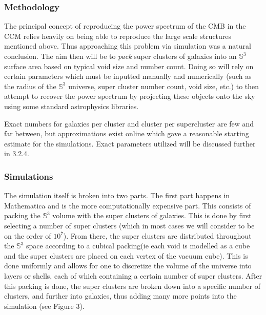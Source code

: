 \documentclass[a4paper]{article}
\begin{document}
    \subsubsection{Methodology}
    The principal concept of reproducing the power spectrum of the CMB in the
    CCM relies heavily on being able to reproduce the large scale structures
    mentioned above. Thus approaching this problem via simulation was a natural
    conclusion. The aim then will be to \textit{pack} super clusters of
    galaxies into an $\mathbb{S}^3$ surface area based on typical void size and
    number count. Doing so will rely on certain parameters which must be
    inputted manually and numerically (such as the radius of the $\mathbb{S}^3$
    universe, super cluster number count, void size, etc.) to then attempt to
    recover the power spectrum by projecting these objects onto the sky using
    some standard astrophysics libraries. 

    Exact numbers for galaxies per cluster and cluster per supercluster are few
    and far between, but approximations exist online which gave a reasonable
    starting estimate for the simulations. Exact parameters utilized will be
    discussed further in 3.2.4.
    
    \subsubsection{Simulations}
    The simulation itself is broken into two parts. The first part happens in
    Mathematica and is the more computationally expensive part. This consists
    of packing the $\mathbb{S}^3$ volume with the super clusters of galaxies.
    This is done by first selecting a number of super clusters (which in most
    cases we will consider to be on the order of $10^7$). From there, the super
    clusters are distributed throughout the $\mathbb{S}^3$ space according to a
    cubical packing\footnotemark (ie each void is modelled as a cube and 
    the super clusters are placed on each vertex of the vacuum cube). This
    is done uniformly and allows for one to discretize the volume of the
    universe into layers or shells, each of which containing a certain number
    of super clusters. After this packing is done, the super clusters are
    broken down into a specific number of clusters, and further into galaxies,
    thus adding many more points into the simulation (see Figure 3).
\end{document}
